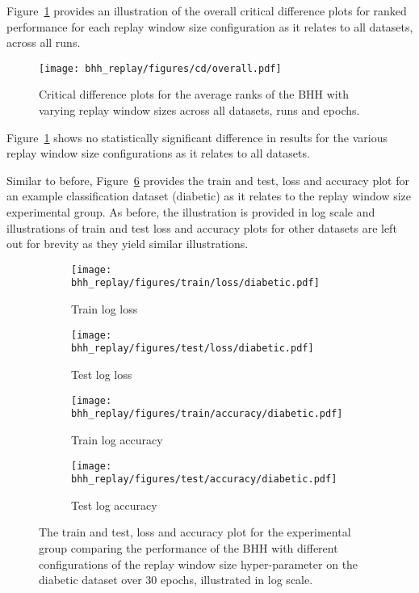 Figure~\ref{fig:results:replay:descriptive:cd} provides an illustration of the overall critical difference plots for ranked performance for each replay window size configuration as it relates to all datasets, across all runs.

\begin{figure}[htbp]
	\centering
	\texttt{[image: bhh\_replay/figures/cd/overall.pdf]}
	\caption{Critical difference plots for the average ranks of the \acs{BHH} with varying replay window sizes across all datasets, runs and epochs.}
	\label{fig:results:replay:descriptive:cd}
\end{figure}

Figure~\ref{fig:results:replay:descriptive:cd} shows no statistically significant difference in results for the various replay window size configurations as it relates to all datasets.

Similar to before, Figure~\ref{fig:results:replay:figures:diabetic} provides the train and test, loss and accuracy plot for an example classification dataset (diabetic) as it relates to the replay window size experimental group. As before, the illustration is provided in log scale and illustrations of train and test loss and accuracy plots for other datasets are left out for brevity as they yield similar illustrations.

\begin{figure}[htbp]
	\begin{subfigure}{0.5\textwidth}
		\centering
		\texttt{[image: bhh\_replay/figures/train/loss/diabetic.pdf]}
		\caption{Train log loss}
		\label{fig:results:replay:figures:loss:train:diabetic}
	\end{subfigure}
	\begin{subfigure}{0.5\textwidth}
		\centering
		\texttt{[image: bhh\_replay/figures/test/loss/diabetic.pdf]}
		\caption{Test log loss}
		\label{fig:results:replay:figures:loss:test:diabetic}
	\end{subfigure}
	\par\bigskip
	\begin{subfigure}{0.5\textwidth}
		\centering
		\texttt{[image: bhh\_replay/figures/train/accuracy/diabetic.pdf]}
		\caption{Train log accuracy}
		\label{fig:results:replay:figures:accuracy:train:diabetic}
	\end{subfigure}
	\begin{subfigure}{0.5\textwidth}
		\centering
		\texttt{[image: bhh\_replay/figures/test/accuracy/diabetic.pdf]}
		\caption{Test log accuracy}
		\label{fig:results:replay:figures:accuracy:test:diabetic}
	\end{subfigure}
	\par\bigskip
	\caption{The train and test, loss and accuracy plot for the experimental group comparing the performance of the \acs{BHH} with different configurations of the replay window size hyper-parameter on the diabetic dataset over 30 epochs, illustrated in log scale.}
	\label{fig:results:replay:figures:diabetic}
\end{figure}


